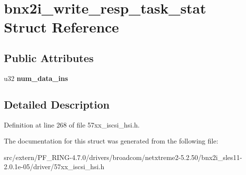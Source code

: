 \hypertarget{structbnx2i__write__resp__task__stat}{
\section{bnx2i\_\-write\_\-resp\_\-task\_\-stat Struct Reference}
\label{structbnx2i__write__resp__task__stat}
}
\subsection*{Public Attributes}
\begin{DoxyCompactItemize}
\item 
\hypertarget{structbnx2i__write__resp__task__stat_a52ec12c96f614e81aaf89087e656fbc2}{
u32 {\bfseries num\_\-data\_\-ins}}
\label{structbnx2i__write__resp__task__stat_a52ec12c96f614e81aaf89087e656fbc2}

\end{DoxyCompactItemize}


\subsection{Detailed Description}


Definition at line 268 of file 57xx\_\-iscsi\_\-hsi.h.



The documentation for this struct was generated from the following file:\begin{DoxyCompactItemize}
\item 
src/extern/PF\_\-RING-\/4.7.0/drivers/broadcom/netxtreme2-\/5.2.50/bnx2i\_\-sles11-\/2.0.1e-\/05/driver/57xx\_\-iscsi\_\-hsi.h\end{DoxyCompactItemize}
